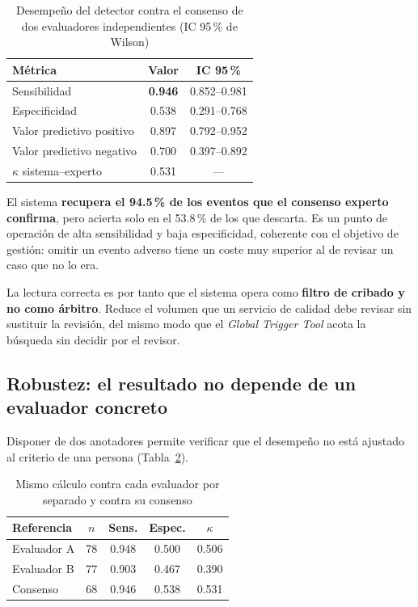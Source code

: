 \documentclass[conference]{IEEEtran}
\begin{document}
\begin{table}[htbp]
\caption{Desempeño del detector contra el consenso de dos evaluadores
independientes (IC 95\,\% de Wilson)}
\label{tab:experto}
\centering
\footnotesize
\begin{tabular}{@{}lcc@{}}
\toprule
\textbf{Métrica} & \textbf{Valor} & \textbf{IC 95\,\%} \\
\midrule
Sensibilidad & \textbf{0.946} & 0.852--0.981 \\
Especificidad & 0.538 & 0.291--0.768 \\
Valor predictivo positivo & 0.897 & 0.792--0.952 \\
Valor predictivo negativo & 0.700 & 0.397--0.892 \\
$\kappa$ sistema--experto & 0.531 & --- \\
\bottomrule
\end{tabular}
\end{table}

El sistema \textbf{recupera el 94.5\,\% de los
eventos que el consenso experto confirma}, pero acierta solo en el
53.8\,\% de los que descarta. Es un punto de
operación de alta sensibilidad y baja especificidad, coherente con el objetivo
de gestión: omitir un evento adverso tiene un coste muy superior al de revisar
un caso que no lo era.

La lectura correcta es por tanto que el sistema opera como \textbf{filtro de
cribado y no como árbitro}. Reduce el volumen que un servicio de calidad debe
revisar sin sustituir la revisión, del mismo modo que el \emph{Global Trigger
Tool} \cite{classen} acota la búsqueda sin decidir por el revisor.

\subsection{Robustez: el resultado no depende de un evaluador concreto}
Disponer de dos anotadores permite verificar que el desempeño no está ajustado
al criterio de una persona (Tabla~\ref{tab:robustez}).

\begin{table}[htbp]
\caption{Mismo cálculo contra cada evaluador por separado y contra su consenso}
\label{tab:robustez}
\centering
\footnotesize
\begin{tabular}{@{}lcccc@{}}
\toprule
\textbf{Referencia} & \textbf{$n$} & \textbf{Sens.} & \textbf{Espec.} & \textbf{$\kappa$} \\
\midrule
Evaluador A & 78 & 0.948 & 0.500 & 0.506 \\
Evaluador B & 77 & 0.903 & 0.467 & 0.390 \\
Consenso & 68 & 0.946 & 0.538 & 0.531 \\
\bottomrule
\end{tabular}
\end{table}
\end{document}
